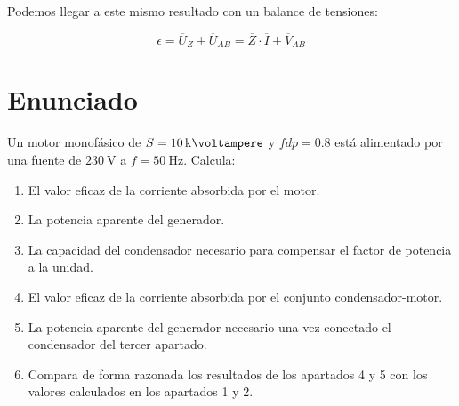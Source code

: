 Podemos llegar a este mismo resultado con un balance de tensiones:

\[
  \overline{\epsilon} = \overline{U}_Z + \overline{U}_{AB} = \overline{Z} \cdot \overline{I} + \overline{V}_{AB}
\]
\section{Enunciado}
Un motor monofásico de $S = \qty{10}{\kilo\voltampere}$ y $fdp = 0.8$ está alimentado por una fuente de $\qty{230}{\volt}$ a $f = \qty{50}{\hertz}$. 
Calcula:
\begin{enumerate}
\item El valor eficaz de la corriente absorbida por el motor.
\item La potencia aparente del generador.
\item La capacidad del condensador necesario para compensar el factor de potencia a la unidad.
\item El valor eficaz de la corriente absorbida por el conjunto condensador-motor. 
\item La potencia aparente del generador necesario una vez conectado el condensador del tercer apartado.
\item Compara de forma razonada los resultados de los apartados 4 y 5 con los valores calculados en los apartados 1 y 2.
\end{enumerate}
